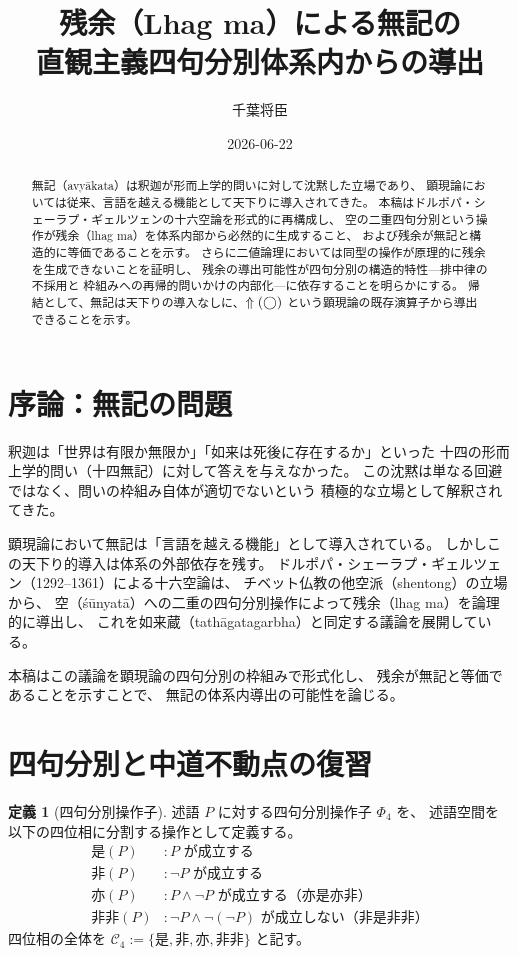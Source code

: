 \documentclass[11pt,a4paper]{article}
\title{残余（Lhag ma）による無記の\\
直観主義四句分別体系内からの導出}
\author{千葉将臣}
\date{2026-06-22}
\theoremstyle{definition}
\newtheorem{definition}{定義}[section]
\newcommand{\phiS}{\text{是}}
\newcommand{\phiN}{\text{非}}
\newcommand{\phiSN}{\text{亦}}
\newcommand{\phiNS}{\text{非非}}
\newcommand{\Phifour}{\Phi_{4}}
\begin{document}
\maketitle

\begin{abstract}
無記（avyākata）は釈迦が形而上学的問いに対して沈黙した立場であり、
顕現論においては従来、言語を越える機能として天下りに導入されてきた。
本稿はドルポパ・シェーラプ・ギェルツェンの十六空論を形式的に再構成し、
空の二重四句分別という操作が残余（lhag ma）を体系内部から必然的に生成すること、
および残余が無記と構造的に等価であることを示す。
さらに二値論理においては同型の操作が原理的に残余を生成できないことを証明し、
残余の導出可能性が四句分別の構造的特性---排中律の不採用と
枠組みへの再帰的問いかけの内部化---に依存することを明らかにする。
帰結として、無記は天下りの導入なしに、$\Uparrow({\bigcirc})$
という顕現論の既存演算子から導出できることを示す。
\end{abstract}

\section{序論：無記の問題}

釈迦は「世界は有限か無限か」「如来は死後に存在するか」といった
十四の形而上学的問い（十四無記）に対して答えを与えなかった。
この沈黙は単なる回避ではなく、問いの枠組み自体が適切でないという
積極的な立場として解釈されてきた。

顕現論において無記は「言語を越える機能」として導入されている。
しかしこの天下り的導入は体系の外部依存を残す。
ドルポパ・シェーラプ・ギェルツェン（1292--1361）による十六空論は、
チベット仏教の他空派（shentong）の立場から、
空（śūnyatā）への二重の四句分別操作によって残余（lhag ma）を論理的に導出し、
これを如来蔵（tathāgatagarbha）と同定する議論を展開している。

本稿はこの議論を顕現論の四句分別の枠組みで形式化し、
残余が無記と等価であることを示すことで、
無記の体系内導出の可能性を論じる。

\section{四句分別と中道不動点の復習}

\begin{definition}[四句分別操作子]
述語 $P$ に対する四句分別操作子 $\Phifour$ を、
述語空間を以下の四位相に分割する操作として定義する。
\begin{align}
\phiS(P) &: P \text{ が成立する}\\
\phiN(P) &: \neg P \text{ が成立する}\\
\phiSN(P) &: P \wedge \neg P \text{ が成立する（亦是亦非）}\\
\phiNS(P) &: \neg P \wedge \neg(\neg P) \text{ が成立しない（非是非非）}
\end{align}
四位相の全体を $\mathcal{C}_4 := \{\phiS, \phiN, \phiSN, \phiNS\}$ と記す。
\end{definition}
\end{document}
